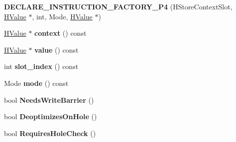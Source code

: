 \begin{DoxyCompactItemize}
\item 
\hypertarget{classv8_1_1internal_1_1_v8___f_i_n_a_l_a3e576fa2bbddf112f5a02fde516d6425}{}{\bfseries D\+E\+C\+L\+A\+R\+E\+\_\+\+I\+N\+S\+T\+R\+U\+C\+T\+I\+O\+N\+\_\+\+F\+A\+C\+T\+O\+R\+Y\+\_\+\+P4} (H\+Store\+Context\+Slot, \hyperlink{classv8_1_1internal_1_1_h_value}{H\+Value} $\ast$, int, Mode, \hyperlink{classv8_1_1internal_1_1_h_value}{H\+Value} $\ast$)\label{classv8_1_1internal_1_1_v8___f_i_n_a_l_a3e576fa2bbddf112f5a02fde516d6425}

\item 
\hypertarget{classv8_1_1internal_1_1_v8___f_i_n_a_l_a8294bece2df148267ec52228e2139030}{}\hyperlink{classv8_1_1internal_1_1_h_value}{H\+Value} $\ast$ {\bfseries context} () const \label{classv8_1_1internal_1_1_v8___f_i_n_a_l_a8294bece2df148267ec52228e2139030}

\item 
\hypertarget{classv8_1_1internal_1_1_v8___f_i_n_a_l_a998b3feae0e84bbe080297551603911f}{}\hyperlink{classv8_1_1internal_1_1_h_value}{H\+Value} $\ast$ {\bfseries value} () const \label{classv8_1_1internal_1_1_v8___f_i_n_a_l_a998b3feae0e84bbe080297551603911f}

\item 
\hypertarget{classv8_1_1internal_1_1_v8___f_i_n_a_l_a545652ddd25053d6fc283843adf4e334}{}int {\bfseries slot\+\_\+index} () const \label{classv8_1_1internal_1_1_v8___f_i_n_a_l_a545652ddd25053d6fc283843adf4e334}

\item 
\hypertarget{classv8_1_1internal_1_1_v8___f_i_n_a_l_a97524cd64c544d93e042006784ced198}{}Mode {\bfseries mode} () const \label{classv8_1_1internal_1_1_v8___f_i_n_a_l_a97524cd64c544d93e042006784ced198}

\item 
\hypertarget{classv8_1_1internal_1_1_v8___f_i_n_a_l_a385305b19f0305f3135782f27e02646a}{}bool {\bfseries Needs\+Write\+Barrier} ()\label{classv8_1_1internal_1_1_v8___f_i_n_a_l_a385305b19f0305f3135782f27e02646a}

\item 
\hypertarget{classv8_1_1internal_1_1_v8___f_i_n_a_l_ae97815c39f21b10c96e3d9654f6c689c}{}bool {\bfseries Deoptimizes\+On\+Hole} ()\label{classv8_1_1internal_1_1_v8___f_i_n_a_l_ae97815c39f21b10c96e3d9654f6c689c}

\item 
\hypertarget{classv8_1_1internal_1_1_v8___f_i_n_a_l_ad8cc70ff598270c0fed15cee38ba508a}{}bool {\bfseries Requires\+Hole\+Check} ()\label{classv8_1_1internal_1_1_v8___f_i_n_a_l_ad8cc70ff598270c0fed15cee38ba508a}


\end{DoxyCompactItemize}
